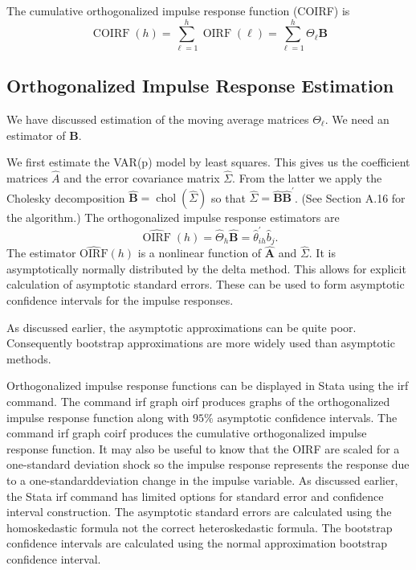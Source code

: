 \documentclass[10pt]{article}
\begin{document}
The cumulative orthogonalized impulse response function (COIRF) is
$$
\operatorname{COIRF}(h)=\sum_{\ell=1}^{h} \operatorname{OIRF}(\ell)=\sum_{\ell=1}^{h} \Theta_{\ell} \boldsymbol{B}
$$

\subsection{Orthogonalized Impulse Response Estimation}
We have discussed estimation of the moving average matrices $\Theta_{\ell}$. We need an estimator of $\boldsymbol{B}$.

We first estimate the VAR(p) model by least squares. This gives us the coefficient matrices $\widehat{A}$ and the error covariance matrix $\widehat{\Sigma}$. From the latter we apply the Cholesky decomposition $\widehat{\boldsymbol{B}}=\operatorname{chol}(\widehat{\Sigma})$ so that $\widehat{\Sigma}=\widehat{\boldsymbol{B}} \widehat{\boldsymbol{B}}^{\prime}$. (See Section A.16 for the algorithm.) The orthogonalized impulse response estimators are
$$
\widehat{\operatorname{OIRF}}(h)=\widehat{\Theta}_{h} \widehat{\boldsymbol{B}}=\widehat{\theta}_{i h}^{\prime} \widehat{b}_{j} .
$$
The estimator $\widehat{\mathrm{OIRF}}(h)$ is a nonlinear function of $\widehat{\boldsymbol{A}}$ and $\widehat{\Sigma}$. It is asymptotically normally distributed by the delta method. This allows for explicit calculation of asymptotic standard errors. These can be used to form asymptotic confidence intervals for the impulse responses.

As discussed earlier, the asymptotic approximations can be quite poor. Consequently bootstrap approximations are more widely used than asymptotic methods.

Orthogonalized impulse response functions can be displayed in Stata using the irf command. The command irf graph oirf produces graphs of the orthogonalized impulse response function along with $95 \%$ asymptotic confidence intervals. The command irf graph coirf produces the cumulative orthogonalized impulse response function. It may also be useful to know that the OIRF are scaled for a one-standard deviation shock so the impulse response represents the response due to a one-standarddeviation change in the impulse variable. As discussed earlier, the Stata irf command has limited options for standard error and confidence interval construction. The asymptotic standard errors are calculated using the homoskedastic formula not the correct heteroskedastic formula. The bootstrap confidence intervals are calculated using the normal approximation bootstrap confidence interval.
\end{document}
